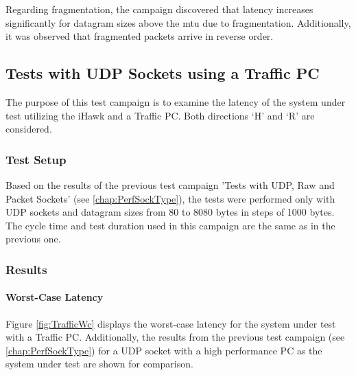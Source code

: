 Regarding fragmentation, the campaign discovered that latency increases significantly for datagram sizes above the \ac{mtu} due to fragmentation. Additionally, it was observed that fragmented packets arrive in reverse order.


\subsection{Tests with UDP Sockets using a Traffic PC}
The purpose of this test campaign is to examine the latency of the system under test utilizing the iHawk and a Traffic PC. Both directions `H' and `R' are considered.

\subsubsection{Test Setup}
Based on the results of the previous test campaign 'Tests with UDP, Raw and Packet Sockets' (see \ref{chap:PerfSockType}), the tests were performed only with UDP sockets and datagram sizes from 80 to 8080 bytes in steps of 1000 bytes. The cycle time and test duration used in this campaign are the same as in the previous one.

\subsubsection{Results}
\paragraph{Worst-Case Latency}

Figure \ref{fig:TrafficWc} displays the worst-case latency for the system under test with a Traffic PC. Additionally, the results from the previous test campaign (see \ref{chap:PerfSockType}) for a UDP socket with a high performance PC as the system under test are shown for comparison.


